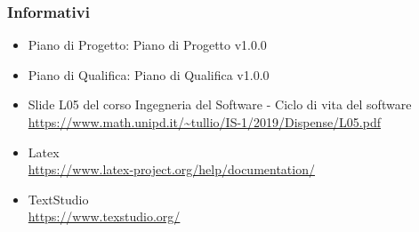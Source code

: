 \subsubsection{Informativi}
\begin{itemize}
	\item Piano di Progetto: Piano di Progetto v1.0.0
	\item Piano di Qualifica: Piano di Qualifica v1.0.0 
	\item Slide L05 del corso Ingegneria del Software - Ciclo di vita del software
	\\ \url{https://www.math.unipd.it/~tullio/IS-1/2019/Dispense/L05.pdf}
	\item Latex
	\\ \url{https://www.latex-project.org/help/documentation/}
	\item TextStudio
	\\ \url{https://www.texstudio.org/}
	
\end{itemize}

